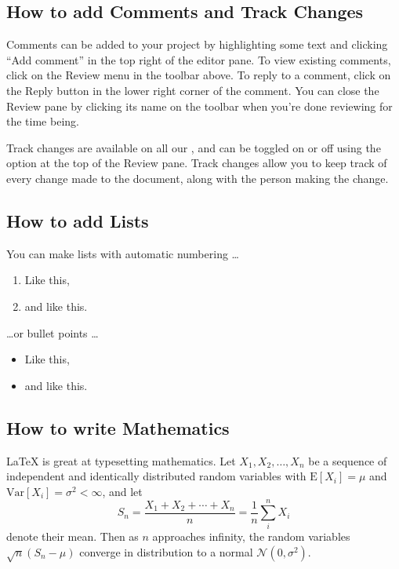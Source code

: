 \subsection{How to add Comments and Track Changes}

Comments can be added to your project by highlighting some text and clicking ``Add comment'' in the top right of the editor pane. To view existing comments, click on the Review menu in the toolbar above. To reply to a comment, click on the Reply button in the lower right corner of the comment. You can close the Review pane by clicking its name on the toolbar when you're done reviewing for the time being.

Track changes are available on all our , and can be toggled on or off using the option at the top of the Review pane. Track changes allow you to keep track of every change made to the document, along with the person making the change. 

\subsection{How to add Lists}

You can make lists with automatic numbering \dots

\begin{enumerate}
\item Like this,
\item and like this.
\end{enumerate}
\dots or bullet points \dots
\begin{itemize}
\item Like this,
\item and like this.
\end{itemize}

\subsection{How to write Mathematics}

\LaTeX{} is great at typesetting mathematics. Let $X_1, X_2, \ldots, X_n$ be a sequence of independent and identically distributed random variables with $\text{E}[X_i] = \mu$ and $\text{Var}[X_i] = \sigma^2 < \infty$, and let
\[S_n = \frac{X_1 + X_2 + \cdots + X_n}{n}
      = \frac{1}{n}\sum_{i}^{n} X_i\]
denote their mean. Then as $n$ approaches infinity, the random variables $\sqrt{n}(S_n - \mu)$ converge in distribution to a normal $\mathcal{N}(0, \sigma^2)$.

